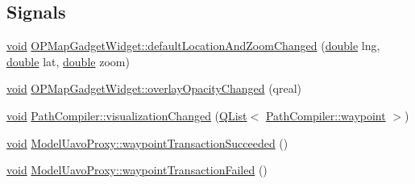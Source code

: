 \subsection*{Signals}
\begin{DoxyCompactItemize}
\item 
\hyperlink{group___u_a_v_objects_plugin_ga444cf2ff3f0ecbe028adce838d373f5c}{void} \hyperlink{group___o_p_map_plugin_ga1e2bbe9f774b6c505ba7645a868f1c52}{O\-P\-Map\-Gadget\-Widget\-::default\-Location\-And\-Zoom\-Changed} (\hyperlink{_super_l_u_support_8h_a8956b2b9f49bf918deed98379d159ca7}{double} lng, \hyperlink{_super_l_u_support_8h_a8956b2b9f49bf918deed98379d159ca7}{double} lat, \hyperlink{_super_l_u_support_8h_a8956b2b9f49bf918deed98379d159ca7}{double} zoom)
\item 
\hyperlink{group___u_a_v_objects_plugin_ga444cf2ff3f0ecbe028adce838d373f5c}{void} \hyperlink{group___o_p_map_plugin_gaa3099fde3c8867538207ed89067345eb}{O\-P\-Map\-Gadget\-Widget\-::overlay\-Opacity\-Changed} (qreal)
\item 
\hyperlink{group___u_a_v_objects_plugin_ga444cf2ff3f0ecbe028adce838d373f5c}{void} \hyperlink{group___o_p_map_plugin_ga9b1e292fa1cea559f4177ac8adb8d19d}{Path\-Compiler\-::visualization\-Changed} (\hyperlink{class_q_list}{Q\-List}$<$ \hyperlink{class_path_compiler_1_1waypoint}{Path\-Compiler\-::waypoint} $>$)
\item 
\hyperlink{group___u_a_v_objects_plugin_ga444cf2ff3f0ecbe028adce838d373f5c}{void} \hyperlink{group___o_p_map_plugin_gaf5825b310723b58fb271811c478954ec}{Model\-Uavo\-Proxy\-::waypoint\-Transaction\-Succeeded} ()
\item 
\hyperlink{group___u_a_v_objects_plugin_ga444cf2ff3f0ecbe028adce838d373f5c}{void} \hyperlink{group___o_p_map_plugin_gafd0e6a7bd5963a1363aace5cbdaac47f}{Model\-Uavo\-Proxy\-::waypoint\-Transaction\-Failed} ()
\end{DoxyCompactItemize}
